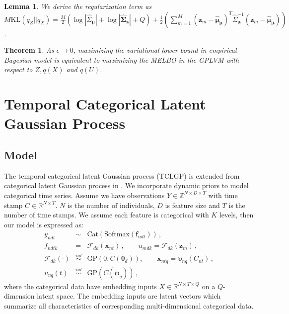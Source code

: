 \documentclass{article}
\newtheorem{lemma}{Lemma}
\newtheorem{theorem}{Theorem}
\begin{document}
\begin{lemma}
	We derive the regularization term as  $M\mathrm{KL}(q_Z || q_X) = \frac{M}{2}(\log |\hat{\Sigma}_{\bm \mu}| + \log|\hat{\bm\Sigma}_{\bm z}| + Q) + \frac{1}{2}\left(\sum_{m = 1}^M(\bm z_m - \hat{\bm \mu}_{\bm \mu})^T\hat{\Sigma}_{\bm\mu}^{-1}(\bm z_m - \hat{\bm \mu}_{\bm \mu})\right)$.
\end{lemma}

\begin{theorem}
	As $\epsilon \rightarrow 0$, maximizing the variational lower bound in empirical Bayesian model is equivalent to maximizing the MELBO in the GPLVM with respect to $Z, q(X)$ and $q(U)$.
\end{theorem}

\section{Temporal Categorical Latent Gaussian Process} \label{sec:TCLGP}
\subsection{Model}
The temporal categorical latent Gaussian process (TCLGP) is extended from categorical latent Gaussian process in \cite{Gal_2015}. We incorporate dynamic priors \citep{Lawrence_2007_HGP, Damianou_2016} to model categorical time series. Assume we have observations $Y \in \mathbb{Z}^{N\times D \times T}$ with time stamp $C \in \mathbb{R}^{N\times T}$. $N$ is the number of individuals, $D$ is feature size and $T$ is the number of time stamps. We assume each feature is categorical with $K$ levels, then our model is expressed as:
\begin{eqnarray}
y_{ndt} & \sim & \mathrm{Cat}(\mathrm{Softmax}(\bm f_{ndt})) \,, \nonumber \\
f_{ndtk} & = & \mathcal{F}_{dk}(\bm x_{nt}) \,, \qquad u_{mdk} = \mathcal{F}_{dk}(\bm z_{m}) \,, \nonumber \\
\mathcal{F}_{dk}(\cdot) & \stackrel{iid}{\sim} & \mathrm{GP}(0,C(\bm \theta_d)), \qquad \bm x_{ntq} = \bm \upsilon_{nq}(C_{nt}) \,, \nonumber \\
\upsilon_{nq}(t) & \stackrel{iid}{\sim} & \mathrm{GP}(C(\bm{\phi}_q)) \nonumber \,,
\end{eqnarray}
where the categorical data have embedding inputs $X \in \mathbb{R}^{N\times T \times Q}$ on a $Q$-dimension latent space. The embedding inputs are latent vectors which summarize all characteristics of corresponding multi-dimensional categorical data.
\end{document}
